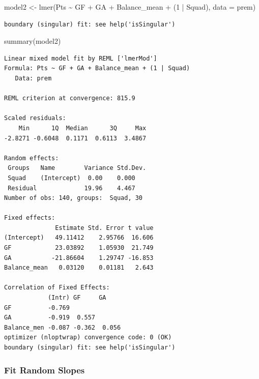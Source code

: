 \documentclass[
  letterpaper,
  DIV=11,
  numbers=noendperiod]{scrartcl}
\newenvironment{Shaded}{\begin{snugshade}}{\end{snugshade}}
\newcommand{\AttributeTok}[1]{\textcolor[rgb]{0.40,0.45,0.13}{#1}}
\newcommand{\DecValTok}[1]{\textcolor[rgb]{0.68,0.00,0.00}{#1}}
\newcommand{\FunctionTok}[1]{\textcolor[rgb]{0.28,0.35,0.67}{#1}}
\newcommand{\NormalTok}[1]{\textcolor[rgb]{0.00,0.23,0.31}{#1}}
\newcommand{\OtherTok}[1]{\textcolor[rgb]{0.00,0.23,0.31}{#1}}
\newcommand{\SpecialCharTok}[1]{\textcolor[rgb]{0.37,0.37,0.37}{#1}}
\begin{document}
\begin{Shaded}
\begin{Highlighting}[]
\NormalTok{model2 }\OtherTok{\textless{}{-}} \FunctionTok{lmer}\NormalTok{(Pts }\SpecialCharTok{\textasciitilde{}}\NormalTok{ GF }\SpecialCharTok{+}\NormalTok{ GA }\SpecialCharTok{+}\NormalTok{ Balance\_mean }\SpecialCharTok{+}\NormalTok{ (}\DecValTok{1} \SpecialCharTok{|}\NormalTok{ Squad), }\AttributeTok{data =}\NormalTok{ prem)}
\end{Highlighting}
\end{Shaded}

\begin{verbatim}
boundary (singular) fit: see help('isSingular')
\end{verbatim}

\begin{Shaded}
\begin{Highlighting}[]
\FunctionTok{summary}\NormalTok{(model2)}
\end{Highlighting}
\end{Shaded}

\begin{verbatim}
Linear mixed model fit by REML ['lmerMod']
Formula: Pts ~ GF + GA + Balance_mean + (1 | Squad)
   Data: prem

REML criterion at convergence: 815.9

Scaled residuals: 
    Min      1Q  Median      3Q     Max 
-2.8271 -0.6048  0.1171  0.6113  3.4867 

Random effects:
 Groups   Name        Variance Std.Dev.
 Squad    (Intercept)  0.00    0.000   
 Residual             19.96    4.467   
Number of obs: 140, groups:  Squad, 30

Fixed effects:
              Estimate Std. Error t value
(Intercept)   49.11412    2.95766  16.606
GF            23.03892    1.05930  21.749
GA           -21.86604    1.29747 -16.853
Balance_mean   0.03120    0.01181   2.643

Correlation of Fixed Effects:
            (Intr) GF     GA    
GF          -0.769              
GA          -0.919  0.557       
Balance_men -0.087 -0.362  0.056
optimizer (nloptwrap) convergence code: 0 (OK)
boundary (singular) fit: see help('isSingular')
\end{verbatim}

\subsubsection{Fit Random Slopes}\label{fit-random-slopes}
\end{document}
